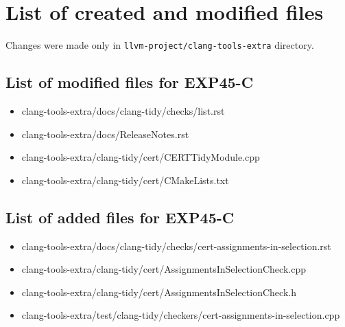 \chapter{List of created and modified files} %
\label{appx:files}

Changes were made only in \lstinline{llvm-project/clang-tools-extra} directory.


\section{List of modified files for EXP45-C}

\begin{itemize}
    \item clang-tools-extra/docs/clang-tidy/checks/list.rst
    \item clang-tools-extra/docs/ReleaseNotes.rst
    \item clang-tools-extra/clang-tidy/cert/CERTTidyModule.cpp
    \item clang-tools-extra/clang-tidy/cert/CMakeLists.txt
\end{itemize}

\section{List of added files for EXP45-C}

\begin{itemize}
    \item clang-tools-extra/docs/clang-tidy/checks/cert-assignments-in-selection.rst
    \item clang-tools-extra/clang-tidy/cert/AssignmentsInSelectionCheck.cpp
    \item clang-tools-extra/clang-tidy/cert/AssignmentsInSelectionCheck.h
    \item clang-tools-extra/test/clang-tidy/checkers/cert-assignments-in-selection.cpp
\end{itemize}
